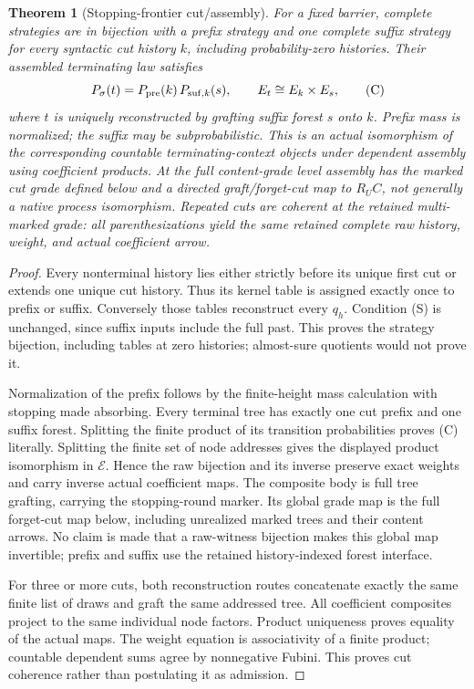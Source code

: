 \documentclass[11pt]{article}
\newtheorem{theorem}{Theorem}
\newcommand{\E}{\mathcal E}
\begin{document}
\begin{theorem}[Stopping-frontier cut/assembly]
For a fixed barrier, complete strategies are in bijection with a prefix strategy and one complete suffix strategy for every syntactic cut history $k$, including probability-zero histories. Their assembled terminating law satisfies
\[
 P_\sigma(t)=P_{\rm pre}(k)\,P_{{\rm suf},k}(s),\qquad
 E_t\cong E_k\times E_s,                                    \tag{C}
\]
where $t$ is uniquely reconstructed by grafting suffix forest $s$ onto $k$. Prefix mass is normalized; the suffix may be subprobabilistic. This is an actual isomorphism of the corresponding countable terminating-context objects under dependent assembly using coefficient products. At the full content-grade level assembly has the marked cut grade defined below and a directed graft/forget-cut map to $R_U C$, not generally a native process isomorphism. Repeated cuts are coherent at the retained multi-marked grade: all parenthesizations yield the same retained complete raw history, weight, and actual coefficient arrow.
\end{theorem}
\begin{proof}
Every nonterminal history lies either strictly before its unique first cut or extends one unique cut history. Thus its kernel table is assigned exactly once to prefix or suffix. Conversely those tables reconstruct every $q_h$. Condition (S) is unchanged, since suffix inputs include the full past. This proves the strategy bijection, including tables at zero histories; almost-sure quotients would not prove it.

Normalization of the prefix follows by the finite-height mass calculation with stopping made absorbing. Every terminal tree has exactly one cut prefix and one suffix forest. Splitting the finite product of its transition probabilities proves (C) literally. Splitting the finite set of node addresses gives the displayed product isomorphism in $\E$. Hence the raw bijection and its inverse preserve exact weights and carry inverse actual coefficient maps. The composite body is full tree grafting, carrying the stopping-round marker. Its global grade map is the full forget-cut map below, including unrealized marked trees and their content arrows. No claim is made that a raw-witness bijection makes this global map invertible; prefix and suffix use the retained history-indexed forest interface.

For three or more cuts, both reconstruction routes concatenate exactly the same finite list of draws and graft the same addressed tree. All coefficient composites project to the same individual node factors. Product uniqueness proves equality of the actual maps. The weight equation is associativity of a finite product; countable dependent sums agree by nonnegative Fubini. This proves cut coherence rather than postulating it as admission.
\end{proof}
\end{document}
